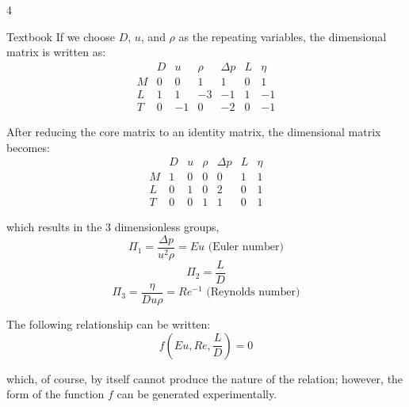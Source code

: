 \documentclass[10pt]{article}
\begin{document}
\begin{multicols*}{4}
\begin{conceptbox}[v1]{Textbook}
		If we choose $D$, $u$, and $\rho$ as the repeating variables, the dimensional matrix is written as:\\

		\begin{equation}
			\begin{array}{ccccccc}
				  & D & u  & \rho & \Delta p & L & \eta \\
				M & 0 & 0  & 1    & 1        & 0 & 1    \\
				L & 1 & 1  & -3   & -1       & 1 & -1   \\
				T & 0 & -1 & 0    & -2       & 0 & -1
			\end{array}
		\end{equation}

		After reducing the core matrix to an identity matrix, the dimensional matrix becomes:\\

		\begin{equation}
			\begin{array}{ccccccc}
				  & D & u & \rho & \Delta p & L & \eta \\
				M & 1 & 0 & 0    & 0        & 1 & 1    \\
				L & 0 & 1 & 0    & 2        & 0 & 1    \\
				T & 0 & 0 & 1    & 1        & 0 & 1
			\end{array}
			\tag{9.8}
		\end{equation}

		which results in the 3 dimensionless groups,\\

		\begin{equation}
			\Pi_1 = \frac{\Delta p}{u^2\rho} = Eu \text{ (Euler number)}
			\tag{9.9}
		\end{equation}
		\begin{equation}
			\Pi_2 = \frac{L}{D}
		\end{equation}
		\begin{equation}
			\Pi_3 = \frac{\eta}{Du\rho} = Re^{-1} \text{ (Reynolds number)}
		\end{equation}

		The following relationship can be written:\\

		\begin{equation}
			f\left(Eu, Re, \frac{L}{D}\right) = 0
			\tag{9.10}
		\end{equation}

		which, of course, by itself cannot produce the nature of the relation; however, the form of the function $f$ can be generated experimentally.\\


\end{conceptbox}
\end{multicols*}
\end{document}
